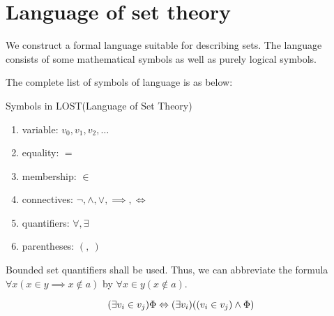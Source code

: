 \section{Language of set theory}

We construct a formal language suitable for describing sets. The language consists of some mathematical symbols as well as purely logical symbols.

The complete list of symbols of language is as below:
\begin{definition}{Symbols in LOST(Language of Set Theory)}{}
    \begin{enumerate}
        \item variable: $v_0, v_1, v_2, \ldots$
        \item equality: $=$
        \item membership: $\in$
        \item connectives: $\neg, \land, \lor, \implies, \iff$
        \item quantifiers: $\forall, \exists$
        \item parentheses: $(,\ )$
    \end{enumerate}
\end{definition}

\begin{remark}
    Bounded set quantifiers shall be used. Thus, we can abbreviate the formula\\
    $\forall x (x \in y \implies x \notin a)$ by $\forall x \in y (x \notin a).$
\end{remark}
\begin{proposition}{}{}
    \[
        (\exists v_i \in v_j)\Phi \iff (\exists v_i)((v_i \in v_j)\wedge \Phi)\\
    \]
\end{proposition}

